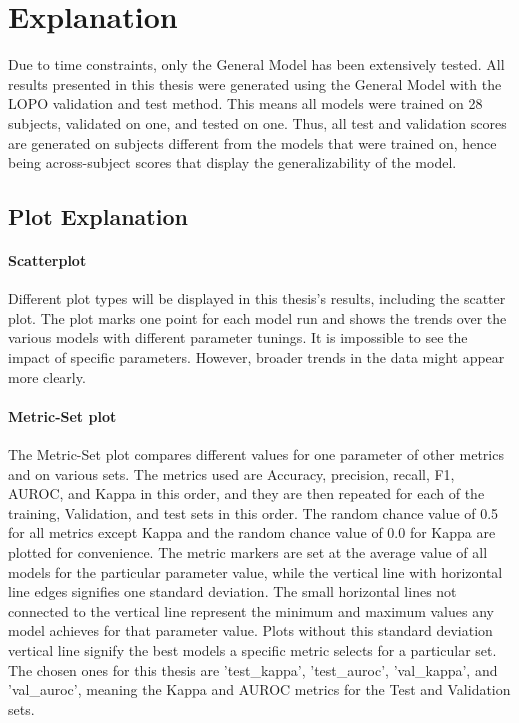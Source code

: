 \section{Explanation}
\label{sec: results_explanation}

Due to time constraints, only the General Model has been extensively tested. All results presented in this thesis were generated using the General Model with the LOPO validation and test method. This means all models were trained on 28 subjects, validated on one, and tested on one. Thus, all test and validation scores are generated on subjects different from the models that were trained on, hence being across-subject scores that display the generalizability of the model. 

\subsection{Plot Explanation}
\paragraph{Scatterplot} Different plot types will be displayed in this thesis's results, including the scatter plot. The plot marks one point for each model run and shows the trends over the various models with different parameter tunings. It is impossible to see the impact of specific parameters. However, broader trends in the data might appear more clearly.

\paragraph{Metric-Set plot} The Metric-Set plot compares different values for one parameter of other metrics and on various sets. The metrics used are Accuracy, precision, recall, F1, AUROC, and Kappa in this order, and they are then repeated for each of the training, Validation, and test sets in this order. The random chance value of 0.5 for all metrics except Kappa and the random chance value of 0.0 for Kappa are plotted for convenience. The metric markers are set at the average value of all models for the particular parameter value, while the vertical line with horizontal line edges signifies one standard deviation. The small horizontal lines not connected to the vertical line represent the minimum and maximum values any model achieves for that parameter value. Plots without this standard deviation vertical line signify the best models a specific metric selects for a particular set. The chosen ones for this thesis are 'test\_kappa', 'test\_auroc', 'val\_kappa', and 'val\_auroc', meaning the Kappa and AUROC metrics for the Test and Validation sets. 

